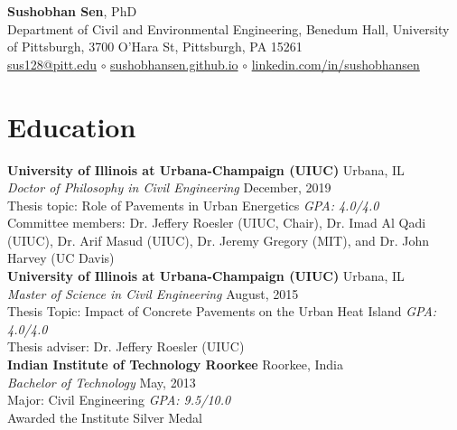 \documentclass[12pt]{article}
\begin{document}
 \sloppy %
\begin{center}
{\large \textbf{Sushobhan Sen}, PhD} \\
Department of Civil and Environmental Engineering, Benedum Hall, University of Pittsburgh, 3700 O'Hara St, Pittsburgh, PA 15261 \\
\href{mailto:sus128@pitt.edu}{sus128@pitt.edu} $\circ$ \href{http://sushobhansen.github.io/}{sushobhansen.github.io} $\circ$ \href{http://linkedin.com/in/sushobhansen}{linkedin.com/in/sushobhansen}
\end{center} 

\hfill %
\section*{Education}
\textbf{University of Illinois at Urbana-Champaign (UIUC)} \hfill Urbana, IL\\
\textit{Doctor of Philosophy in Civil Engineering} \hfill December, 2019\\
Thesis topic: Role of Pavements in Urban Energetics \hfill \textit{GPA: 4.0/4.0}\\
Committee members: Dr. Jeffery Roesler (UIUC, Chair), Dr. Imad Al Qadi (UIUC), Dr. Arif Masud (UIUC), Dr. Jeremy Gregory (MIT), and Dr. John Harvey (UC Davis)\\

\textbf{University of Illinois at Urbana-Champaign (UIUC)} \hfill Urbana, IL\\
\textit{Master of Science in Civil Engineering} \hfill August, 2015\\
Thesis Topic: Impact of Concrete Pavements on the Urban Heat Island \hfill \textit{GPA: 4.0/4.0} \\
Thesis adviser: Dr. Jeffery Roesler (UIUC) \\

\textbf{Indian Institute of Technology Roorkee} \hfill Roorkee, India\\
\textit{Bachelor of Technology} \hfill May, 2013\\
Major: Civil Engineering \hfill \textit{GPA: 9.5/10.0} \\
Awarded the Institute Silver Medal  %
\end{document}
